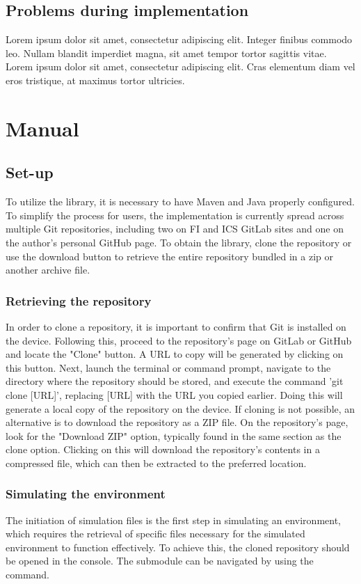 \documentclass[
  digital,     %
  oneside,     %
  nosansbold,  %
  nocolorbold, %
  lof,         %
  lot,         %
]{fithesis4}
\begin{document}
\section{Problems during implementation}
Lorem ipsum dolor sit amet, consectetur adipiscing elit. Integer finibus commodo leo. Nullam blandit imperdiet magna, sit amet tempor tortor sagittis vitae. Lorem ipsum dolor sit amet, consectetur adipiscing elit. Cras elementum diam vel eros tristique, at maximus tortor ultricies.


\chapter{Manual}
\shorthandoff{-}
\section{Set-up}
To utilize the library, it is necessary to have Maven and Java properly configured. To simplify the process for users, the implementation is currently spread across multiple Git repositories, including two on FI and ICS GitLab sites and one on the author's personal GitHub page. To obtain the library, clone the repository or use the download button to retrieve the entire repository bundled in a zip or another archive file.

\subsection{Retrieving the repository}
In order to clone a repository, it is important to confirm that Git is installed on the device. Following this, proceed to the repository's page on GitLab or GitHub and locate the "Clone" button. A URL to copy will be generated by clicking on this button. Next, launch the terminal or command prompt, navigate to the directory where the repository should be stored, and execute the command 'git clone [URL]', replacing [URL] with the URL you copied earlier. Doing this will generate a local copy of the repository on the device. If cloning is not possible, an alternative is to download the repository as a ZIP file. On the repository's page, look for the "Download ZIP" option, typically found in the same section as the clone option. Clicking on this will download the repository's contents in a compressed file, which can then be extracted to the preferred location.

\subsection{Simulating the environment}
The initiation of simulation files is the first step in simulating an environment, which requires the retrieval of specific files necessary for the simulated environment to function effectively. To achieve this, the cloned repository should be opened in the console. The submodule can be navigated by using the command.
\end{document}
